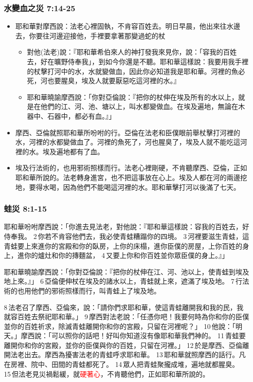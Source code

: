 \subsubsection{水變血之災 7:14-25}
\begin{itemize} 
\itemsep-.35em 
\item 耶和華對摩西說：法老心裡固執，不肯容百姓去。明日早晨，他出來往水邊去，你要往河邊迎接他，手裡要拿著那變過蛇的杖
\begin{itemize} 
\itemsep-.35em 
\item 對他(法老)說：『耶和華希伯來人的神打發我來見你，說：「容我的百姓去，好在曠野侍奉我」，到如今你還是不聽。耶和華這樣說：我要用我手裡的杖擊打河中的水，水就變做血，因此你必知道我是耶和華。河裡的魚必死，河也要腥臭，埃及人就要厭惡吃這河裡的水。』
\item 耶和華曉諭摩西說：「你對亞倫說：『把你的杖伸在埃及所有的水以上，就是在他們的江、河、池、塘以上，叫水都變做血。在埃及遍地，無論在木器中、石器中，都必有血。』」
\end{itemize}
\item 摩西、亞倫就照耶和華所吩咐的行。亞倫在法老和臣僕眼前舉杖擊打河裡的水，河裡的水都變做血了。河裡的魚死了，河也腥臭了，埃及人就不能吃這河裡的水。埃及遍地都有了血。 
\item 埃及行法術的，也用邪術照樣而行。法老心裡剛硬，不肯聽摩西、亞倫，正如耶和華所說的。法老轉身進宮，也不把這事放在心上。埃及人都在河的兩邊挖地，要得水喝，因為他們不能喝這河裡的水。耶和華擊打河以後滿了七天。
\end{itemize}

\subsubsection{蛙災 8:1-15}
耶和華吩咐摩西說：「你進去見法老，對他說：『耶和華這樣說：容我的百姓去，好侍奉我。 2 你若不肯容他們去，我必使青蛙糟蹋你的四境。 3 河裡要滋生青蛙，這青蛙要上來進你的宮殿和你的臥房，上你的床榻，進你臣僕的房屋，上你百姓的身上，進你的爐灶和你的摶麵盆， 4 又要上你和你百姓並你眾臣僕的身上。』」

耶和華曉諭摩西說：「你對亞倫說：『把你的杖伸在江、河、池以上，使青蛙到埃及地上來。』」 6 亞倫便伸杖在埃及的諸水以上，青蛙就上來，遮滿了埃及地。 7 行法術的也用他們的邪術照樣而行，叫青蛙上了埃及地。

8 法老召了摩西、亞倫來，說：「請你們求耶和華，使這青蛙離開我和我的民，我就容百姓去祭祀耶和華。」 9 摩西對法老說：「任憑你吧！我要何時為你和你的臣僕並你的百姓祈求，除滅青蛙離開你和你的宮殿，只留在河裡呢？」 10 他說：「明天。」摩西說：「可以照你的話吧！好叫你知道沒有像耶和華我們神的。 11 青蛙要離開你和你的宮殿，並你的臣僕與你的百姓，只留在河裡。」 12 於是摩西、亞倫離開法老出去。摩西為擾害法老的青蛙呼求耶和華。 13 耶和華就照摩西的話行。凡在房裡、院中、田間的青蛙都死了。 14 眾人把青蛙聚攏成堆，遍地就都腥臭。 15 但法老見災禍鬆緩，就\textcolor{red}{硬著心}，不肯聽他們，正如耶和華所說的。


